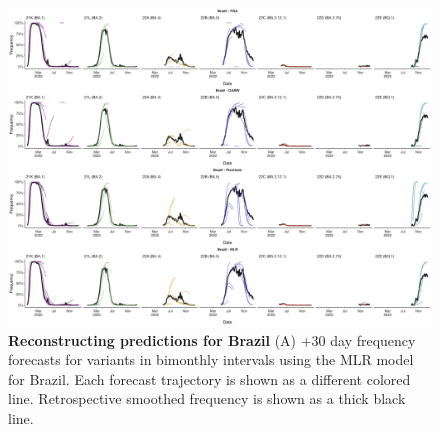 \begin{figure}[th!]
	\centering
	\includegraphics[width=0.9\textwidth=0.01]{supp_figures/supplementary_fig_Brazil.png}
	\caption[\textbf{Reconstructing predictions for Brazil}]{
		\textbf{Reconstructing predictions for Brazil}
		(A) +30 day frequency forecasts for variants in bimonthly intervals using the MLR model for Brazil.
		Each forecast trajectory is shown as a different colored line.
		Retrospective smoothed frequency is shown as a thick black line.
	}
	\label{fig:S3}
\end{figure}


